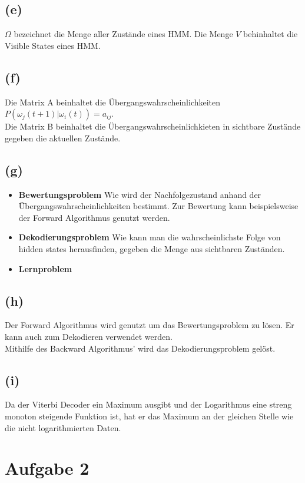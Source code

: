 \documentclass[a4paper]{scrartcl}
\begin{document}
\subsection*{(e)}
$\Omega$ bezeichnet die Menge aller Zustände eines HMM.
Die Menge $V$ behinhaltet die Visible States eines HMM.

\subsection*{(f)}
Die Matrix A beinhaltet die Übergangswahrscheinlichkeiten $P(\omega_j(t+1)|\omega_i(t))=a_{ij}$.\\
Die Matrix B beinhaltet die Übergangswahrscheinlichkieten in sichtbare Zustände gegeben die aktuellen Zustände.


\subsection*{(g)}
\begin{itemize}
	\item \textbf{Bewertungsproblem} Wie wird der Nachfolgezustand anhand der Übergangswahrscheinlichkeiten bestimmt. %
	Zur Bewertung kann beispielsweise der Forward Algorithmus genutzt werden.
	
	\item \textbf{Dekodierungsproblem} Wie kann man die wahrscheinlichste Folge von hidden states herausfinden, gegeben die Menge aus sichtbaren Zuständen.
	
	\item \textbf{Lernproblem} %
\end{itemize}


\subsection*{(h)}
Der Forward Algorithmus wird genutzt um das Bewertungsproblem zu lösen. Er kann auch zum Dekodieren verwendet werden.
\\
Mithilfe des Backward Algorithmus' wird das Dekodierungsproblem gelöst.
\subsection*{(i)}
Da der Viterbi Decoder ein Maximum ausgibt und der Logarithmus eine streng monoton steigende Funktion ist, hat er das Maximum an der gleichen Stelle wie die nicht logarithmierten Daten.



\section*{Aufgabe 2}
\end{document}
